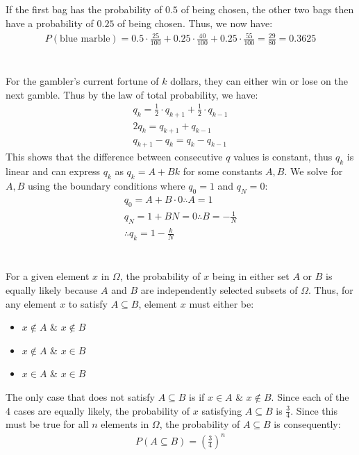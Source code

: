 \documentclass[11pt,a4paper,margin=1in]{article}
\begin{document}
    \subsection{}
        If the first bag has the probability of $0.5$ of being chosen, the other
        two bags then have a probability of $0.25$ of being chosen. Thus, we now
        have:
        \begin{gather*}
            P(\text{blue marble}) = 0.5 \cdot \frac{25}{100} + 0.25 \cdot \frac{40}{100} + 0.25 \cdot \frac{55}{100} = \frac{29}{80} = 0.3625
        \end{gather*}

\section{}
    For the gambler's current fortune of $k$ dollars, they can either win or lose
    on the next gamble. Thus by the law of total probability, we have:
    \begin{gather*}
        q_k = \frac{1}{2} \cdot q_{k + 1} + \frac{1}{2} \cdot q_{k - 1}\\
        2q_k = q_{k + 1} + q_{k - 1}\\
        q_{k + 1} - q_k = q_k - q_{k - 1}
    \end{gather*}
    This shows that the difference between consecutive $q$ values is constant, thus
    $q_k$ is linear and can express $q_k$ as $q_k = A + Bk$ for some constants $A, B$.
    We solve for $A, B$ using the boundary conditions where $q_0 = 1$ and $q_N = 0$:
    \begin{gather*}
        q_0 = A + B \cdot 0 \therefore A = 1\\
        q_N = 1 + BN = 0 \therefore B = -\frac{1}{N}\\
        \therefore q_k = 1 - \frac{k}{N}
    \end{gather*}

\section{}
    For a given element $x$ in $\Omega$, the probability of $x$ being in either 
    set $A$ or $B$ is equally likely because $A$ and $B$ are independently selected
    subsets of $\Omega$. Thus, for any element $x$ to satisfy $A \subseteq B$, element
    $x$ must either be:
    \begin{itemize}
        \item $x \notin A$ \& $x \notin B$ 
        \item $x \notin A$ \& $x \in B$
        \item $x \in A$ \& $x \in B$
    \end{itemize} 
    \noindent The only case that does not satisfy $A \subseteq B$ is if $x \in A$ \& $x \notin B$.
    Since each of the 4 cases are equally likely, the probability of $x$ satisfying
    $A \subseteq B$ is $\frac{3}{4}$. Since this must be true for all $n$ elements
    in $\Omega$, the probability of $A \subseteq B$ is consequently:
    \begin{gather*}
        P(A \subseteq B) = \left(\frac{3}{4}\right)^n
    \end{gather*}
\end{document}
